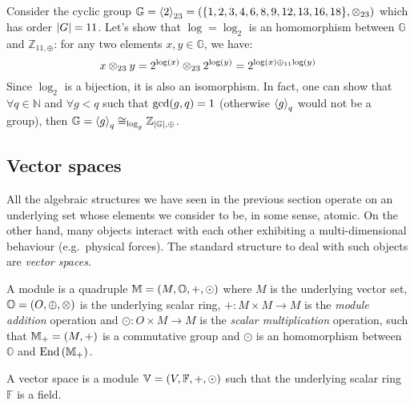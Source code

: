 \begin{example}\label{ex:cyclic_group}
  Consider the cyclic group 
  \(\mathbb{G} = \gengroup{2}_{23} = \Tuple{\Set{1, 2, 3, 4, 6, 8, 9, 12, 13, 16, 18}, \otimes_{23}}\)
  which has order \(\left\lvert G\right\rvert = 11\).
  Let's show that \(\log = \log_2\) is an homomorphism between \(\mathbb{G}\) and 
  \(\mathbb{Z}_{11,\oplus}\): for any two elements \(x, y \in \mathbb{G}\), 
  we have:
  \[
    x \otimes_{23} y = 2^{\log\left(x\right)} \otimes_{23} 2^{\log\left(y\right)} = 
    2^{\log\left(x\right) \oplus_{11} \log\left(y\right)}
  \]
  Since \(\log_2\) is a bijection, it is also an isomorphism.
  In fact, one can show that \(\forall q \in \mathbb{N}\) and \(\forall g < q\) such 
  that \(\call{\gcd}{g, q} = 1\) (otherwise \(\left\langle g\right\rangle_{q}\) would not be a group), then
  \(\mathbb{G} = \left\langle g\right\rangle_{q} \cong_{\log_g} \mathbb{Z}_{\left\lvert\mathbb{G}\right\rvert,\oplus}\).
\end{example}

\subsection{Vector spaces}
All the algebraic structures we have seen in the previous section operate on an underlying set 
whose elements we consider to be, in some sense, atomic.
On the other hand, many objects interact with each other exhibiting a multi-dimensional behaviour 
(e.g.\ physical forces).
The standard structure to deal with such objects are \emph{vector spaces}.
\begin{definition}[Module]
  A module is a quadruple \(\mathbb{M} = \left(M, \mathbb{O}, +, \odot\right)\) where 
  \(M\) is the underlying vector set, \(\mathbb{O} = \left(O, \oplus, \otimes\right)\) is the underlying 
  scalar ring, \(+\colon M \times M \to M\) is the \emph{module addition} operation and 
  \(\odot\colon O \times M \to M\) is the \emph{scalar multiplication} operation, such 
  that \(\mathbb{M}_{+} = \left(M, +\right)\) is a commutative group and \(\odot \) is an 
  homomorphism between \(\mathbb{O}\) and \(\mathrm{End}\left(\mathbb{M}_{+}\right)\).
\end{definition} 

\begin{definition}
  A vector space is a module \(\mathbb{V} = \left(V, \mathbb{F}, +, \odot\right)\) such that the 
  underlying scalar ring \(\mathbb{F}\) is a field.
\end{definition} 

